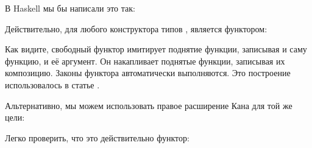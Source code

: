 В Haskell мы бы написали это так:

Действительно, для любого конструктора типов ,  является
функтором:

Как видите, свободный функтор имитирует поднятие функции,
записывая и саму функцию, и её аргумент. Он накапливает поднятые
функции, записывая их композицию. Законы функтора
автоматически выполняются. Это построение использовалось в статье
.

Альтернативно, мы можем использовать правое расширение Кана для той же цели:

Легко проверить, что это действительно функтор:

